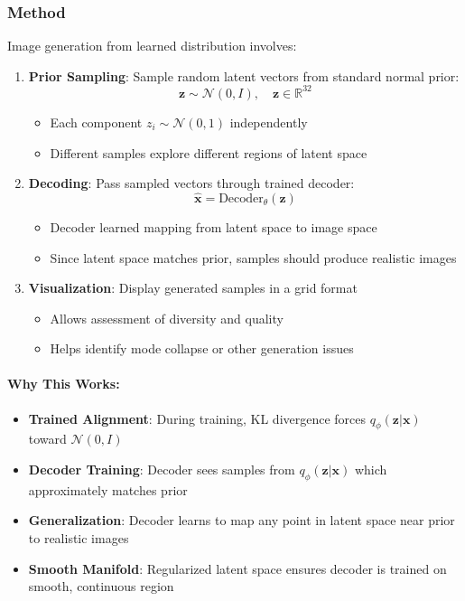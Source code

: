 \documentclass[conference]{IEEEtran}
\begin{document}
\subsubsection{Method}

Image generation from learned distribution involves:

\begin{enumerate}
    \item \textbf{Prior Sampling}: Sample random latent vectors from standard normal prior:
    \begin{equation}
    \mathbf{z} \sim \mathcal{N}(0, I), \quad \mathbf{z} \in \mathbb{R}^{32}
    \end{equation}
    \begin{itemize}
        \item Each component $z_i \sim \mathcal{N}(0, 1)$ independently
        \item Different samples explore different regions of latent space
    \end{itemize}
    
    \item \textbf{Decoding}: Pass sampled vectors through trained decoder:
    \begin{equation}
    \hat{\mathbf{x}} = \text{Decoder}_\theta(\mathbf{z})
    \end{equation}
    \begin{itemize}
        \item Decoder learned mapping from latent space to image space
        \item Since latent space matches prior, samples should produce realistic images
    \end{itemize}
    
    \item \textbf{Visualization}: Display generated samples in a grid format
    \begin{itemize}
        \item Allows assessment of diversity and quality
        \item Helps identify mode collapse or other generation issues
    \end{itemize}
\end{enumerate}

\paragraph{Why This Works:}
\begin{itemize}
    \item \textbf{Trained Alignment}: During training, KL divergence forces $q_\phi(\mathbf{z}|\mathbf{x})$ toward $\mathcal{N}(0, I)$
    \item \textbf{Decoder Training}: Decoder sees samples from $q_\phi(\mathbf{z}|\mathbf{x})$ which approximately matches prior
    \item \textbf{Generalization}: Decoder learns to map any point in latent space near prior to realistic images
    \item \textbf{Smooth Manifold}: Regularized latent space ensures decoder is trained on smooth, continuous region
\end{itemize}
\end{document}
